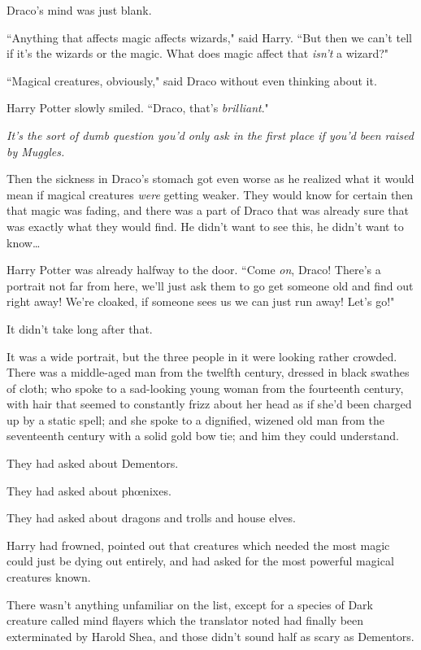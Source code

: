 Draco's mind was just blank.

``Anything that affects magic affects wizards," said Harry. ``But then we can't tell if it's the wizards or the magic. What does magic affect that \emph{isn't} a wizard?"

``Magical creatures, obviously," said Draco without even thinking about it.

Harry Potter slowly smiled. ``Draco, that's \emph{brilliant}."

\emph{It's the sort of dumb question you'd only ask in the first place if you'd been raised by Muggles.}

Then the sickness in Draco's stomach got even worse as he realized what it would mean if magical creatures \emph{were} getting weaker. They would know for certain then that magic was fading, and there was a part of Draco that was already sure that was exactly what they would find. He didn't want to see this, he didn't want to know{\ldots}

Harry Potter was already halfway to the door. ``Come \emph{on}, Draco! There's a portrait not far from here, we'll just ask them to go get someone old and find out right away! We're cloaked, if someone sees us we can just run away! Let's go!"

\later

It didn't take long after that.

It was a wide portrait, but the three people in it were looking rather crowded. There was a middle-aged man from the twelfth century, dressed in black swathes of cloth; who spoke to a sad-looking young woman from the fourteenth century, with hair that seemed to constantly frizz about her head as if she'd been charged up by a static spell; and she spoke to a dignified, wizened old man from the seventeenth century with a solid gold bow tie; and him they could understand.

They had asked about Dementors.

They had asked about phœnixes.

They had asked about dragons and trolls and house elves.

Harry had frowned, pointed out that creatures which needed the most magic could just be dying out entirely, and had asked for the most powerful magical creatures known.

There wasn't anything unfamiliar on the list, except for a species of Dark creature called mind flayers which the translator noted had finally been exterminated by Harold Shea, and those didn't sound half as scary as Dementors.

